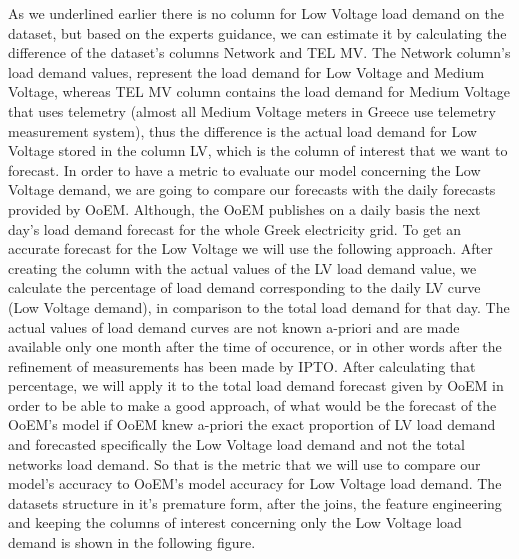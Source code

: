 \par As we underlined earlier there is no column for Low Voltage load demand on the dataset, but based on the experts guidance, we can estimate it by calculating the difference of the dataset's columns Network and TEL MV. The Network column's load demand values, represent the load demand for Low Voltage and Medium Voltage, whereas TEL MV column contains the load demand for Medium Voltage that uses telemetry (almost all Medium Voltage meters in Greece use telemetry measurement system), thus the difference is the actual load demand for Low Voltage stored in the column LV, which is the column of interest that we want to forecast. In order to have a metric to evaluate our model concerning the Low Voltage demand, we are going to compare our forecasts with the daily forecasts provided by OoEM. Although, the OoEM publishes on a daily basis the next day's load demand forecast for the whole Greek electricity grid. To get an accurate forecast for the Low Voltage we will use the following approach. After creating the column with the actual values of the LV load demand value, we calculate the percentage of load demand corresponding to the daily LV curve (Low Voltage demand), in comparison to the total load demand for that day. The actual values of load demand curves are not known a-priori and are made available only one month after the time of occurence, or in other words after the refinement of measurements has been made by IPTO. After calculating that percentage, we will apply it to the total load demand forecast given by OoEM in order to be able to make a good approach, of what would be the forecast of the OoEM's model if OoEM knew a-priori the exact proportion of LV load demand and forecasted specifically the Low Voltage load demand and not the total networks load demand. So that is the metric that we will use to compare our model's accuracy to OoEM's model accuracy for Low Voltage load demand. The datasets structure in it's premature form, after the joins, the feature engineering and keeping the columns of interest concerning only the Low Voltage load demand is shown in the following figure.
